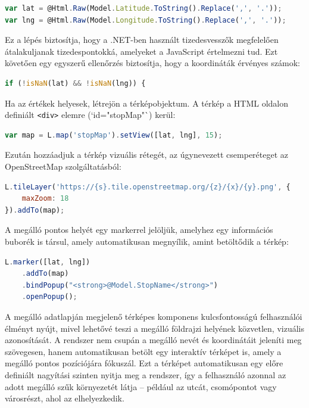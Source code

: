 \begin{lstlisting}[language=JavaScript]
var lat = @Html.Raw(Model.Latitude.ToString().Replace(',', '.'));
var lng = @Html.Raw(Model.Longitude.ToString().Replace(',', '.'));
\end{lstlisting}

Ez a lépés biztosítja, hogy a .NET-ben használt tizedesvesszők megfelelően átalakuljanak tizedespontokká, amelyeket a JavaScript értelmezni tud. Ezt követően egy egyszerű ellenőrzés biztosítja, hogy a koordináták érvényes számok:

\begin{lstlisting}[language=JavaScript]
if (!isNaN(lat) && !isNaN(lng)) {
\end{lstlisting}

Ha az értékek helyesek, létrejön a térképobjektum. A térkép a HTML oldalon definiált \texttt{<div>} elemre (`id="stopMap"`) kerül:

\begin{lstlisting}[language=JavaScript]
var map = L.map('stopMap').setView([lat, lng], 15);
\end{lstlisting}

Ezután hozzáadjuk a térkép vizuális rétegét, az úgynevezett csemperéteget az OpenStreetMap szolgáltatásból:

\begin{lstlisting}[language=JavaScript]
L.tileLayer('https://{s}.tile.openstreetmap.org/{z}/{x}/{y}.png', {
    maxZoom: 18
}).addTo(map);
\end{lstlisting}

A megálló pontos helyét egy markerrel jelöljük, amelyhez egy információs buborék is társul, amely automatikusan megnyílik, amint betöltődik a térkép:

\begin{lstlisting}[language=JavaScript]
L.marker([lat, lng])
    .addTo(map)
    .bindPopup("<strong>@Model.StopName</strong>")
    .openPopup();
\end{lstlisting}

A megálló adatlapján megjelenő térképes komponens kulcsfontosságú felhasználói élményt nyújt, mivel lehetővé teszi a megálló földrajzi helyének közvetlen, vizuális azonosítását. A rendszer nem csupán a megálló nevét és koordinátáit jeleníti meg szövegesen, hanem automatikusan betölt egy interaktív térképet is, amely a megálló pontos pozíciójára fókuszál. Ezt a térképet automatikusan egy előre definiált nagyítási szinten nyitja meg a rendszer, így a felhasználó azonnal az adott megálló szűk környezetét látja – például az utcát, csomópontot vagy városrészt, ahol az elhelyezkedik.

